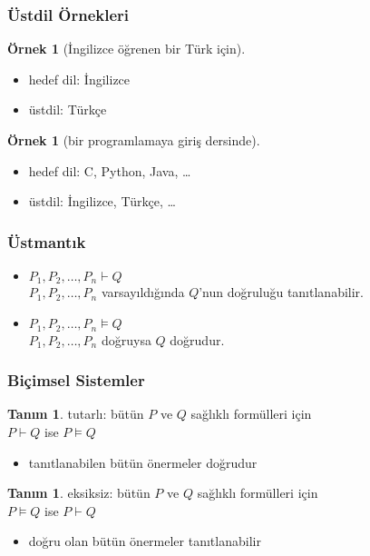 \documentclass[dvipsnames]{beamer}
\theoremstyle{definition}
\newtheorem{tanim}[theorem]{Tanım}
\theoremstyle{example}
\newtheorem{ornek}[theorem]{Örnek}
\theoremstyle{plain}
\begin{document}
\begin{frame}
  \frametitle{Üstdil Örnekleri}

  \begin{ornek}[İngilizce öğrenen bir Türk için]
    \begin{itemize}
      \item hedef dil: İngilizce
      \item üstdil: Türkçe
    \end{itemize}
  \end{ornek}

  \pause
  \begin{ornek}[bir programlamaya giriş dersinde]
    \begin{itemize}
      \item hedef dil: C, Python, Java, \ldots
      \item üstdil: İngilizce, Türkçe, \ldots
    \end{itemize}
  \end{ornek}
\end{frame}

\begin{frame}
  \frametitle{Üstmantık}

  \begin{itemize}
    \item $P_1,P_2,\dots,P_n \vdash Q$\\
      $P_1,P_2,\dots,P_n$ varsayıldığında $Q$'nun doğruluğu tanıtlanabilir.

    \pause
    \medskip
    \item $P_1,P_2,\dots,P_n \vDash Q$\\
      $P_1,P_2,\dots,P_n$ doğruysa $Q$ doğrudur.
  \end{itemize}
\end{frame}

\begin{frame}
  \frametitle{Biçimsel Sistemler}

  \begin{tanim}
    \alert{tutarlı}: bütün $P$ ve $Q$ sağlıklı formülleri için\\
      $P \vdash Q$ ise $P \vDash Q$
    \begin{itemize}
      \item tanıtlanabilen bütün önermeler doğrudur
    \end{itemize}
  \end{tanim}

  \pause
  \begin{tanim}
    \alert{eksiksiz}: bütün $P$ ve $Q$ sağlıklı formülleri için\\
      $P \vDash Q$ ise $P \vdash Q$
    \begin{itemize}
      \item doğru olan bütün önermeler tanıtlanabilir
    \end{itemize}
  \end{tanim}
\end{frame}
\end{document}
